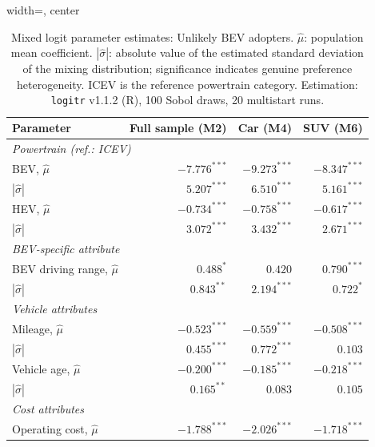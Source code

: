 \begin{table}[pos=H]
\caption{Mixed logit parameter estimates: Unlikely BEV adopters. $\hat{\mu}$: population mean coefficient. $|\hat{\sigma}|$: absolute value of the estimated standard deviation of the mixing distribution; significance indicates genuine preference heterogeneity. ICEV is the reference powertrain category. Estimation: \texttt{logitr} v1.1.2 (R), 100 Sobol draws, 20 multistart runs.}
\label{table:mxl_unlikely}
\begin{adjustbox}{width=\textwidth, center}
{\renewcommand{\arraystretch}{1.25}
\begin{tabular}{lrrr}
\toprule
\textbf{Parameter} & \textbf{Full sample (M2)} & \textbf{Car (M4)} & \textbf{SUV (M6)} \\
\midrule
\multicolumn{4}{l}{\textit{Powertrain (ref.: ICEV)}} \\[2pt]
\quad BEV, $\hat{\mu}$               & $-7.776^{***}$  & $-9.273^{***}$  & $-8.347^{***}$ \\
\quad\quad $|\hat{\sigma}|$          & $5.207^{***}$   & $6.510^{***}$   & $5.161^{***}$  \\[3pt]
\quad HEV, $\hat{\mu}$               & $-0.734^{***}$  & $-0.758^{***}$  & $-0.617^{***}$ \\
\quad\quad $|\hat{\sigma}|$          & $3.072^{***}$   & $3.432^{***}$   & $2.671^{***}$  \\[3pt]
\multicolumn{4}{l}{\textit{BEV-specific attribute}} \\[2pt]
\quad BEV driving range, $\hat{\mu}$ & $\phantom{-}0.488^{*}$   & $\phantom{-}0.420$        & $\phantom{-}0.790^{***}$ \\
\quad\quad $|\hat{\sigma}|$          & $0.843^{**}$    & $2.194^{***}$   & $0.722^{*}$    \\[3pt]
\multicolumn{4}{l}{\textit{Vehicle attributes}} \\[2pt]
\quad Mileage, $\hat{\mu}$           & $-0.523^{***}$  & $-0.559^{***}$  & $-0.508^{***}$ \\
\quad\quad $|\hat{\sigma}|$          & $0.455^{***}$   & $0.772^{***}$   & $0.103$        \\[3pt]
\quad Vehicle age, $\hat{\mu}$       & $-0.200^{***}$  & $-0.185^{***}$  & $-0.218^{***}$ \\
\quad\quad $|\hat{\sigma}|$          & $0.165^{**}$    & $0.083$         & $0.105$        \\[3pt]
\multicolumn{4}{l}{\textit{Cost attributes}} \\[2pt]
\quad Operating cost, $\hat{\mu}$    & $-1.788^{***}$  & $-2.026^{***}$  & $-1.718^{***}$ \\

\end{tabular}}
\end{adjustbox}
\end{table}
